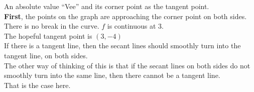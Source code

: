\documentclass{ximera}
\begin{document}
\begin{image}
\end{image}

An absolute value ``Vee'' and its corner point as the tangent point. \\


\textbf{First}, the points on the graph are approaching the corner point on both sides.  There is no break in the curve. $f$ is continuous at $3$.\\


The hopeful tangent point is $(3, -4)$ \\


If there is a tangent line, then the secant lines should smoothly turn into the tangent line, on both sides.  \\


The other way of thinking of this is that if the secant lines on both sides do not smoothly turn into the same line, then there cannot be a tangent line. \\

That is the case here. \\
\end{document}
